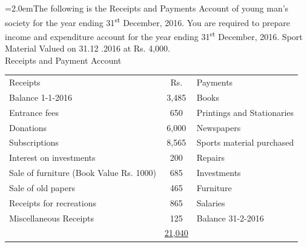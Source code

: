 \documentclass[11pt,a4paper]{article}
\newcommand{\lqn}[2]{\Needspace{6\baselineskip}\par\medskip\noindent\hangindent=2.0em\hangafter=1\makebox[2.0em][l]{\textbf{#1.}}#2\par}
\begin{document}
\lqn{18}{The following is the Receipts and Payments Account of young man’s society for the year ending 31\textsuperscript{st}  December, 2016. You are required to prepare income and expenditure account for the year ending 31\textsuperscript{st}  December, 2016. Sport Material Valued on 31.12 .2016 at Rs. 4,000.\\
Receipts and Payment Account\par
\par\smallskip\noindent\hspace*{1.2em}\begin{tabular}{lcl}
Receipts & Rs. & Payments \\
Balance 1-1-2016 & 3,485 & Books \\
Entrance fees & 650 & Printings and Stationaries \\
Donations & 6,000 & Newspapers \\
Subscriptions & 8,565 & Sports material purchased \\
Interest on investments & 200 & Repairs \\
Sale of furniture (Book Value Rs. 1000) & 685 & Investments \\
Sale of old papers & 465 & Furniture \\
Receipts for recreations & 865 & Salaries \\
Miscellaneous Receipts & 125 & Balance 31-2-2016 \\
 & \underline{\underline{21,040}} &  \\
\end{tabular}\par\smallskip
}
\end{document}
